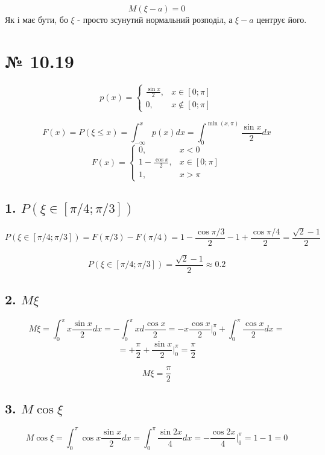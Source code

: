 \documentclass[11pt, a4paper]{article} %
\begin{document}
\begin{mdframed}[style=ans]
    $$M(\xi-a) = 0$$
    Як і має бути, бо $\xi$ - просто зсунутий нормальний розподіл, а $\xi-a$ центрує його.
\end{mdframed}

\section*{№ 10.19}

\begin{mdframed}
    $$p(x) = \begin{cases}
        \frac{\sin x}{2}, & x\in [0;\pi]\\
        0,& x\notin [0;\pi]
    \end{cases}$$
\end{mdframed}

$$F(x) = P(\xi \le x) = \int_{-\infty}^x p(x) dx = \int_0^{\min(x,\pi)} \frac{\sin x}{2} dx$$
$$F(x) = \begin{cases}
    0, & x<0\\
    1-\frac{\cos x}{2}, & x\in [0;\pi]\\
    1, & x>\pi
\end{cases}$$


\subsection*{1. $P(\xi \in [\pi/4; \pi/3])$}

$$P(\xi \in [\pi/4; \pi/3]) = F(\pi/3) - F(\pi/4) = 1-\frac{\cos \pi/3}{2} - 1 + \frac{\cos \pi/4}{2} = \frac{\sqrt{2}-1}{2}$$

\begin{mdframed}[style=ans]
    $$P(\xi \in [\pi/4; \pi/3]) = \frac{\sqrt{2}-1}{2} \approx 0.2$$
\end{mdframed}

\subsection*{2. $M\xi$}
$$M\xi = \int_0^\pi x \frac{\sin x}{2} dx = - \int_0^\pi x  d\frac{\cos x}{2} = -x\frac{\cos x}{2} |_0^\pi + \int_0^\pi \frac{\cos x}{2} dx = $$
$$= +\frac{\pi}{2} + \frac{\sin x}{2} |_0^\pi = \frac{\pi}{2}  $$

\begin{mdframed}[style=ans]
    $$M\xi =\frac{\pi}{2}$$
\end{mdframed}

\subsection*{3. $M\cos \xi$}
$$M\cos \xi = \int_0^\pi \cos x \frac{\sin x}{2} dx = \int_0^\pi \frac{\sin 2x}{4} dx = -\frac{\cos 2x}{4} |_0^\pi = 1 - 1 = 0 $$
\end{document}
